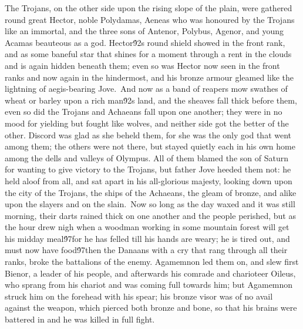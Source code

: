 {The Trojans, on the other side upon the rising slope of the plain, were gathered round great Hector, noble Polydamas, Aeneas who was honoured by the Trojans like an immortal, and the three sons of Antenor, Polybus, Agenor, and young Acamas beauteous as a god. Hector\'92s round shield showed in the front rank, and as some baneful star that shines for a moment through a rent in the clouds and is again hidden beneath them; even so was Hector now seen in the front ranks and now again in the hindermost, and his bronze armour gleamed like the lightning of aegis-bearing Jove.\
And now as a band of reapers mow swathes of wheat or barley upon a rich man\'92s land, and the sheaves fall thick before them, even so did the Trojans and Achaeans fall upon one another; they were in no mood for yielding but fought like wolves, and neither side got the better of the other. Discord was glad as she beheld them, for she was the only god that went among them; the others were not there, but stayed quietly each in his own home among the dells and valleys of Olympus. All of them blamed the son of Saturn for wanting to give victory to the Trojans, but father Jove heeded them not: he held aloof from all, and sat apart in his all-glorious majesty, looking down upon the city of the Trojans, the ships of the Achaeans, the gleam of bronze, and alike upon the slayers and on the slain.\
Now so long as the day waxed and it was still morning, their darts rained thick on one another and the people perished, but as the hour drew nigh when a woodman working in some mountain forest will get his midday meal\'97for he has felled till his hands are weary; he is tired out, and must now have food\'97then the Danaans with a cry that rang through all their ranks, broke the battalions of the enemy. Agamemnon led them on, and slew first Bienor, a leader of his people, and afterwards his comrade and charioteer Oileus, who sprang from his chariot and was coming full towards him; but Agamemnon struck him on the forehead with his spear; his bronze visor was of no avail against the weapon, which pierced both bronze and bone, so that his brains were battered in and he was killed in full fight.\
}
